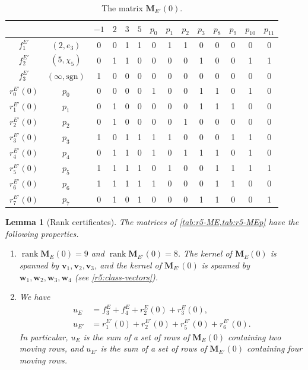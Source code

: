 \documentclass[12pt,oneside,openany]{book}
\theoremstyle{definition}
\theoremstyle{plain}
\numberwithin{equation}{chapter}
\theoremstyle{plain}
\newtheorem{lemma}[lemma]{Lemma}
\theoremstyle{definition}
\theoremstyle{remark}
\DeclareMathOperator{\rk}{rank}
\begin{document}
\begin{table}[htbp]
\centering
\caption{The matrix $\mathbf M_{E'}(0)$.}\label{tab:r5-MEp}
\renewcommand{\arraystretch}{1.15}
\begin{tabular}{cc|cccc|cccccccc}
& & $-1$ & $2$ & $3$ & $5$ & $p_0$ & $p_1$ & $p_2$ & $p_3$ & $p_8$ & $p_9$ & $p_{10}$ & $p_{11}$\\
\hline
$f^{E'}_1$ & $(2,e_3)$ & 0 & 0 & 1 & 1 & 0 & 1 & 1 & 0 & 0 & 0 & 0 & 0 \\
$f^{E'}_2$ & $(5,\chi_5)$ & 0 & 1 & 1 & 0 & 0 & 0 & 0 & 1 & 0 & 0 & 1 & 1 \\
$f^{E'}_3$ & $(\infty,\mathrm{sgn})$ & 1 & 0 & 0 & 0 & 0 & 0 & 0 & 0 & 0 & 0 & 0 & 0 \\
\hline
$r^{E'}_0(0)$ & $p_0$ & 0 & 0 & 0 & 0 & 1 & 0 & 0 & 1 & 1 & 0 & 1 & 0 \\
$r^{E'}_1(0)$ & $p_1$ & 0 & 1 & 0 & 0 & 0 & 0 & 0 & 1 & 1 & 1 & 0 & 0 \\
$r^{E'}_2(0)$ & $p_2$ & 0 & 1 & 0 & 0 & 0 & 0 & 1 & 0 & 0 & 0 & 0 & 0 \\
$r^{E'}_3(0)$ & $p_3$ & 1 & 0 & 1 & 1 & 1 & 1 & 0 & 0 & 0 & 1 & 1 & 0 \\
$r^{E'}_4(0)$ & $p_4$ & 0 & 1 & 1 & 0 & 1 & 0 & 1 & 1 & 1 & 0 & 1 & 0 \\
$r^{E'}_5(0)$ & $p_5$ & 1 & 1 & 1 & 1 & 0 & 1 & 0 & 0 & 1 & 1 & 1 & 1 \\
$r^{E'}_6(0)$ & $p_6$ & 1 & 1 & 1 & 1 & 1 & 0 & 0 & 0 & 1 & 1 & 0 & 0 \\
$r^{E'}_7(0)$ & $p_7$ & 0 & 1 & 0 & 1 & 0 & 0 & 0 & 1 & 1 & 0 & 0 & 1 \\
\end{tabular}
\end{table}

\begin{lemma}[Rank certificates]\label{lem:r5-certificate}
The matrices of \cref{tab:r5-ME,tab:r5-MEp} have the following properties.
\begin{enumerate}[label=(\alph*)]
\item\label{item:r5-cert-rank} $\rk\mathbf M_E(0)=9$ and $\rk\mathbf M_{E'}(0)=8$. The kernel of $\mathbf M_E(0)$ is spanned by $\mathbf v_1,\mathbf v_2,\mathbf v_3$, and the kernel of $\mathbf M_{E'}(0)$ is spanned by $\mathbf w_1,\mathbf w_2,\mathbf w_3,\mathbf w_4$ (see \eqref{r5:class-vectors}).
\item\label{item:r5-cert-u} We have
\begin{equation}\label{r5:u-sums}
\begin{aligned}
u_E&=f^E_3+f^E_4+r^E_2(0)+r^E_3(0),\\
u_{E'}&=r^{E'}_1(0)+r^{E'}_2(0)+r^{E'}_5(0)+r^{E'}_6(0).
\end{aligned}
\end{equation}
In particular, $u_E$ is the sum of a set of rows of $\mathbf M_E(0)$ containing two moving rows, and $u_{E'}$ is the sum of a set of rows of $\mathbf M_{E'}(0)$ containing four moving rows.
\end{enumerate}
\end{lemma}
\end{document}
